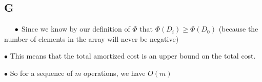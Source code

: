 \documentclass[12pt]{article}
\begin{document}
\subsection{G}



$\indent\bullet$ Since we know by our definition of $\Phi$ that $\Phi(D_{i}) \geq \Phi(D_{0})$ (because the number of elements in the array will never be negative)

$\bullet$ This means that the total amortized cost is an upper bound on the total cost.

$\bullet$ So for a sequence of $m$ operations, we have $O(m)$
\end{document}
